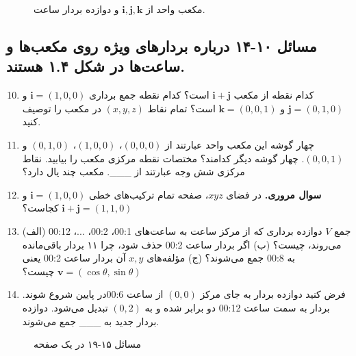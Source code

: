 \documentclass[12pt, a4paper]{book}
\begin{document}
	\begin{figure}[h!]
		\centering
		\caption{مکعب واحد از $\mathbf{i, j, k}$ و دوازده بردار ساعت.}
	\end{figure}
	
	\subsection*{مسائل ۱۰-۱۴ درباره بردارهای ویژه روی مکعب‌ها و ساعت‌ها در شکل ۱.۴ هستند.}
	\begin{enumerate}
		\setcounter{enumi}{9}
		\item کدام نقطه از مکعب $\mathbf{i}+\mathbf{j}$ است؟ کدام نقطه جمع برداری $\mathbf{i}=(1,0,0)$ و $\mathbf{j}=(0,1,0)$ و $\mathbf{k}=(0,0,1)$ است؟ تمام نقاط $(x,y,z)$ در مکعب را توصیف کنید.
		\item چهار گوشه این مکعب واحد عبارتند از $(0,0,0)$، $(1,0,0)$، $(0,1,0)$ و $(0,0,1)$. چهار گوشه دیگر کدامند؟ مختصات نقطه مرکزی مکعب را بیابید. نقاط مرکزی شش وجه عبارتند از \_\_\_. مکعب چند یال دارد؟
		\item \textbf{سوال مروری.} در فضای $xyz$، صفحه تمام ترکیب‌های خطی $\mathbf{i}=(1,0,0)$ و $\mathbf{i}+\mathbf{j}=(1,1,0)$ کجاست؟
		\item 
		(الف) جمع $V$ دوازده برداری که از مرکز ساعت به ساعت‌های 00:1، 00:2، ...، 00:12 می‌روند، چیست؟
		(ب) اگر بردار ساعت 00:2 حذف شود، چرا ۱۱ بردار باقی‌مانده به 00:8 جمع می‌شوند؟
		(ج) مؤلفه‌های $x, y$ آن بردار ساعت 00:2 یعنی $\mathbf{v}=(\cos\theta, \sin\theta)$ چیست؟
		\item فرض کنید دوازده بردار به جای مرکز $(0,0)$ از ساعت 00:6در پایین شروع شوند. بردار به سمت ساعت 00:12 دو برابر شده و به $(0,2)$ تبدیل می‌شود. دوازده بردار جدید به \_\_\_ جمع می‌شوند.
	\end{enumerate}
	
	\begin{figure}[h!]
		\centering
		\caption{مسائل ۱۵-۱۹ در یک صفحه}
	\end{figure}
	
\end{document}
